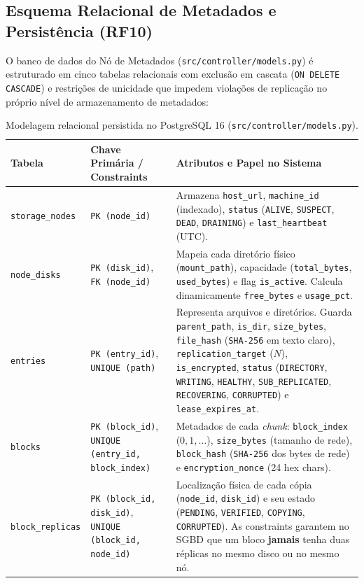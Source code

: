 \documentclass[10pt,a4paper]{article}
\begin{document}
\subsection{Esquema Relacional de Metadados e Persistência (RF10)}
O banco de dados do Nó de Metadados (\texttt{src/controller/models.py}) é estruturado em cinco tabelas relacionais com exclusão em cascata (\texttt{ON DELETE CASCADE}) e restrições de unicidade que impedem violações de replicação no próprio nível de armazenamento de metadados:

\begin{table}[htbp]
\centering
\footnotesize
\renewcommand{\arraystretch}{1.15}
\begin{tabularx}{\textwidth}{l l Y}
\toprule
\textbf{Tabela} & \textbf{Chave Primária / Constraints} & \textbf{Atributos e Papel no Sistema} \\
\midrule
\texttt{storage\_nodes} & \texttt{PK (node\_id)} & Armazena \texttt{host\_url}, \texttt{machine\_id} (indexado), \texttt{status} (\texttt{ALIVE}, \texttt{SUSPECT}, \texttt{DEAD}, \texttt{DRAINING}) e \texttt{last\_heartbeat} (UTC). \\
\texttt{node\_disks} & \texttt{PK (disk\_id)}, \texttt{FK (node\_id)} & Mapeia cada diretório físico (\texttt{mount\_path}), capacidade (\texttt{total\_bytes}, \texttt{used\_bytes}) e flag \texttt{is\_active}. Calcula dinamicamente \texttt{free\_bytes} e \texttt{usage\_pct}. \\
\texttt{entries} & \texttt{PK (entry\_id)}, \texttt{UNIQUE (path)} & Representa arquivos e diretórios. Guarda \texttt{parent\_path}, \texttt{is\_dir}, \texttt{size\_bytes}, \texttt{file\_hash} (\texttt{SHA-256} em texto claro), \texttt{replication\_target} ($N$), \texttt{is\_encrypted}, \texttt{status} (\texttt{DIRECTORY}, \texttt{WRITING}, \texttt{HEALTHY}, \texttt{SUB\_REPLICATED}, \texttt{RECOVERING}, \texttt{CORRUPTED}) e \texttt{lease\_expires\_at}. \\
\texttt{blocks} & \texttt{PK (block\_id)}, \texttt{UNIQUE (entry\_id, block\_index)} & Metadados de cada \textit{chunk}: \texttt{block\_index} ($0, 1, \dots$), \texttt{size\_bytes} (tamanho de rede), \texttt{block\_hash} (\texttt{SHA-256} dos bytes de rede) e \texttt{encryption\_nonce} (24 hex chars). \\
\texttt{block\_replicas} & \texttt{PK (block\_id, disk\_id)}, \texttt{UNIQUE (block\_id, node\_id)} & Localização física de cada cópia (\texttt{node\_id}, \texttt{disk\_id}) e seu estado (\texttt{PENDING}, \texttt{VERIFIED}, \texttt{COPYING}, \texttt{CORRUPTED}). As constraints garantem no SGBD que um bloco \textbf{jamais} tenha duas réplicas no mesmo disco ou no mesmo nó. \\
\bottomrule
\end{tabularx}
\caption{Modelagem relacional persistida no PostgreSQL 16 (\texttt{src/controller/models.py}).}
\label{tab:schema}
\end{table}
\end{document}
